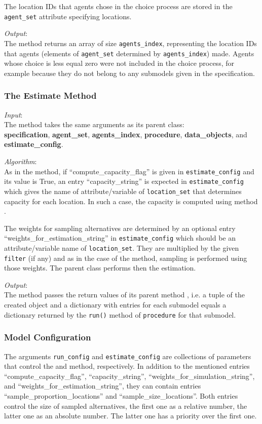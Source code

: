 The location IDs that agents chose in the choice process are stored
in the \verb|agent_set| attribute specifying locations.

{\it Output}:\\[1mm]
The method returns an array of size \verb|agents_index|,
representing the location IDs that agents (elements of
\verb|agent_set| determined by \verb|agents_index|) made. Agents
whose choice is less equal zero were not included in the choice
process, for example because they do not belong to any submodels
given in the specification.


\subsubsection{The Estimate Method}
%
{\it Input}:~\\[1mm]
The  method takes the same arguments as its parent class:\\
{\bf specification}, {\bf agent_set}, {\bf agents_index}, {\bf procedure},
{\bf data_objects}, and {\bf estimate_config}.

{\it Algorithm}:\\[1mm]
As in the  method, if ``compute_capacity_flag'' is given in
\verb|estimate_config| and its value is True, an entry ``capacity_string'' is
expected in \verb|estimate_config| which gives the name of attribute/variable \attributesindex\variablesindex
of \verb|location_set| that determines capacity for each location. In such a
case, the capacity is computed using method
.

The weights for sampling alternatives are determined by an optional entry
``weights_for_estimation_string'' in \verb|estimate_config| which should be an
attribute/variable \attributesindex\variablesindex name of \verb|location_set|. They are multiplied by the
given \verb|filter| (if any) and as in the case of the  method,
sampling is performed using those weights. The parent class performs then the
estimation.

{\it Output}:\\[1mm]
The method passes the return values of its parent method ,
i.e. a tuple of the created  object and a
dictionary with entries for each submodel equals a dictionary returned by the
\verb|run()| method of \verb|procedure| for that submodel.

%
\subsubsection{Model Configuration}
\modelsindex
%
The arguments \verb|run_config| and \verb|estimate_config| are collections of
parameters that control the  and  method,
respectively. In addition to the mentioned entries ``compute_capacity_flag'',
``capacity_string'', ``weights_for_simulation_string'', and ``weights_for_estimation_string'', they can contain entries
``sample_proportion_locations'' and ``sample_size_locations''. Both entries
control the size of sampled alternatives, the first one as a relative number,
the latter one as an absolute number. The latter one has a priority over the
first one.

